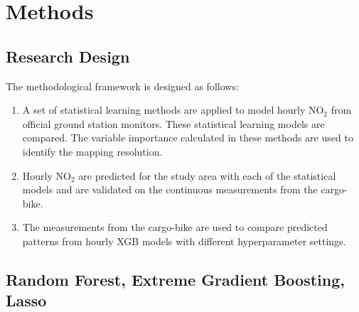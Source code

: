 \documentclass{article}
\begin{document}
\section{Methods}

\subsection{Research Design}
The methodological framework is designed as follows: 
\begin{enumerate}
    \item A set of statistical learning methods are applied to model hourly NO$_2$ from official ground station monitors. These statistical learning models are compared. The variable importance calculated in these methods are used to identify the mapping resolution. 
    
    \item Hourly NO$_2$ are predicted for the study area with each of the statistical models and are validated on the continuous measurements from the cargo-bike.
    
    \item The measurements from the cargo-bike are used to compare predicted patterns from hourly XGB models with different hyperparameter settings. 
    
\end{enumerate} 




\subsection{Random Forest, Extreme Gradient Boosting, Lasso}
\end{document}
